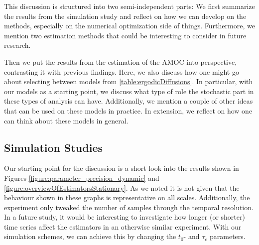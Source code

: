 This discussion is structured into two semi-independent parts: We first summarize the results from the simulation study and reflect on how we can develop on the methods, especially on the numerical optimization side of things. Furthermore, we mention two estimation methods that could be interesting to consider in future research.

Then we put the results from the estimation of the AMOC into perspective, contrasting it with previous findings. Here, we also discuss how one might go about selecting between models from \ref{table:ergodicDiffusions}. In particular, with our models as a starting point, we discuss what type of role the stochastic part in these types of analysis can have. Additionally, we mention a couple of other ideas that can be used on these models in practice. In extension, we reflect on how one can think about these models in general.
\subsection{Simulation Studies}
Our starting point for the discussion is a short look into the results shown in Figures \ref{figure:parameter_precision_dynamic} and \ref{figure:overviewOfEstimatorsStationary}. As we noted it is not given that the behaviour shown in these graphs is representative on all scales. Additionally, the experiment only tweaked the number of samples through the temporal resolution. In a future study, it would be interesting to investigate how longer (or shorter) time series affect the estimators in an otherwise similar experiment. With our simulation schemes, we can achieve this by changing the $t_0$- and $\tau_c$ parameters.

